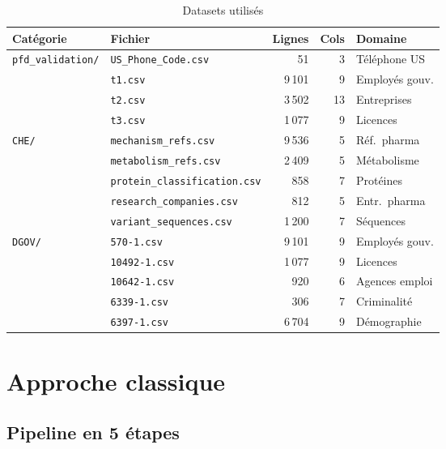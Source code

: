 \documentclass[12pt,a4paper]{article}
\begin{document}
\begin{table}[H]
\centering
\caption{Datasets utilis\'{e}s}
\label{tab:datasets}
\footnotesize
\begin{tabular}{@{}llrrl@{}}
\toprule
\textbf{Cat\'{e}gorie} & \textbf{Fichier} & \textbf{Lignes} & \textbf{Cols} & \textbf{Domaine} \\
\midrule
\multirow{4}{*}{\texttt{pfd\_validation/}}
  & \texttt{US\_Phone\_Code.csv} & 51 & 3 & T\'{e}l\'{e}phone US \\
  & \texttt{t1.csv} & 9\,101 & 9 & Employ\'{e}s gouv. \\
  & \texttt{t2.csv} & 3\,502 & 13 & Entreprises \\
  & \texttt{t3.csv} & 1\,077 & 9 & Licences \\
\midrule
\multirow{5}{*}{\texttt{CHE/}}
  & \texttt{mechanism\_refs.csv} & 9\,536 & 5 & R\'{e}f.\ pharma \\
  & \texttt{metabolism\_refs.csv} & 2\,409 & 5 & M\'{e}tabolisme \\
  & \texttt{protein\_classification.csv} & 858 & 7 & Prot\'{e}ines \\
  & \texttt{research\_companies.csv} & 812 & 5 & Entr.\ pharma \\
  & \texttt{variant\_sequences.csv} & 1\,200 & 7 & S\'{e}quences \\
\midrule
\multirow{5}{*}{\texttt{DGOV/}}
  & \texttt{570-1.csv} & 9\,101 & 9 & Employ\'{e}s gouv. \\
  & \texttt{10492-1.csv} & 1\,077 & 9 & Licences \\
  & \texttt{10642-1.csv} & 920 & 6 & Agences emploi \\
  & \texttt{6339-1.csv} & 306 & 7 & Criminalit\'{e} \\
  & \texttt{6397-1.csv} & 6\,704 & 9 & D\'{e}mographie \\
\bottomrule
\end{tabular}
\end{table}

\section{Approche classique}
\label{sec:classique}

\subsection{Pipeline en 5 \'{e}tapes}
\end{document}
